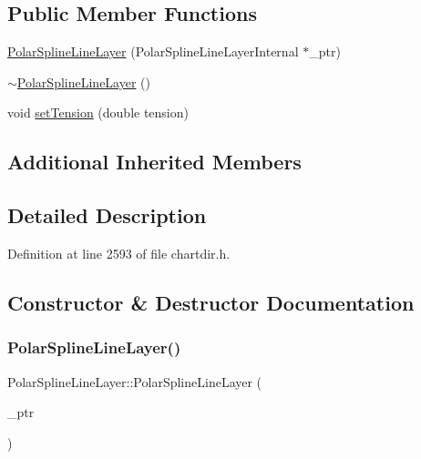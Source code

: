 \subsection*{Public Member Functions}
\begin{DoxyCompactItemize}
\item 
\hyperlink{class_polar_spline_line_layer_a32d0eb74457350d7b608b0e2708752a5}{Polar\+Spline\+Line\+Layer} (Polar\+Spline\+Line\+Layer\+Internal $\ast$\+\_\+ptr)
\item 
\hyperlink{class_polar_spline_line_layer_a63ad952368bfaede06c620991ad3666c}{$\sim$\+Polar\+Spline\+Line\+Layer} ()
\item 
void \hyperlink{class_polar_spline_line_layer_a61d176212357ddf5126b1f8a69dabdf5}{set\+Tension} (double tension)
\end{DoxyCompactItemize}
\subsection*{Additional Inherited Members}


\subsection{Detailed Description}


Definition at line 2593 of file chartdir.\+h.



\subsection{Constructor \& Destructor Documentation}
\mbox{\label{class_polar_spline_line_layer_a32d0eb74457350d7b608b0e2708752a5}} 
\subsubsection{\texorpdfstring{Polar\+Spline\+Line\+Layer()}{PolarSplineLineLayer()}}
{\footnotesize\ttfamily Polar\+Spline\+Line\+Layer\+::\+Polar\+Spline\+Line\+Layer (\begin{DoxyParamCaption}\item[{Polar\+Spline\+Line\+Layer\+Internal $\ast$}]{\+\_\+ptr }\end{DoxyParamCaption})\hspace{0.3cm}{\ttfamily [inline]}}




